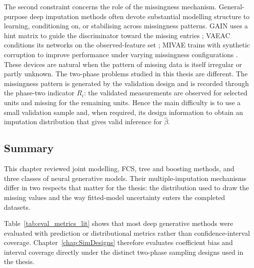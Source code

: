 The second constraint concerns the role of the missingness mechanism. General-purpose deep imputation methods often devote substantial modelling structure to learning, conditioning on, or stabilising across missingness patterns. GAIN uses a hint matrix to guide the discriminator toward the missing entries \citep{yoon2018gain}; VAEAC conditions its networks on the observed-feature set \citep{ivanov2018variational}; MIVAE trains with synthetic corruption to improve performance under varying missingness configurations \citep{ma2023mivae}. These devices are natural when the pattern of missing data is itself irregular or partly unknown. The two-phase problems studied in this thesis are different. The missingness pattern is generated by the validation design and is recorded through the phase-two indicator $R_i$: the validated measurements are observed for selected units and missing for the remaining units. Hence the main difficulty is to use a small validation sample and, when required, its design information to obtain an imputation distribution that gives valid inference for $\hat{\beta}$.

\subsection{Summary}

This chapter reviewed joint modelling, FCS, tree and boosting methods, and three classes of neural generative models. Their multiple-imputation mechanisms differ in two respects that matter for the thesis: the distribution used to draw the missing values and the way fitted-model uncertainty enters the completed datasets.

Table~\ref{tab:eval_metrics_lit} shows that most deep generative methods were evaluated with prediction or distributional metrics rather than confidence-interval coverage. Chapter~\ref{chap:SimDesigns} therefore evaluates coefficient bias and interval coverage directly under the distinct two-phase sampling designs used in the thesis.
